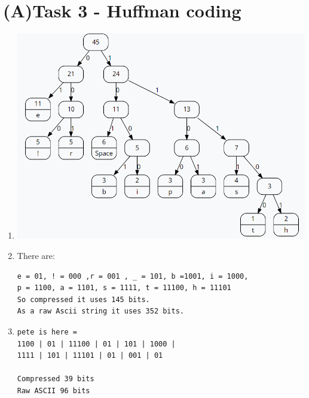 \documentclass[a4paper,12pt]{article}
\begin{document}
\section{(A)Task 3 - Huffman coding}

\begin{enumerate}
\item 
\includegraphics[scale=0.6]{hufftree}
\item There are:
\begin{lstlisting}
e = 01, ! = 000 ,r = 001 , _ = 101, b =1001, i = 1000, 
p = 1100, a = 1101, s = 1111, t = 11100, h = 11101
So compressed it uses 145 bits.
As a raw Ascii string it uses 352 bits.
\end{lstlisting}

\item 
\begin{lstlisting}
pete is here = 
1100 | 01 | 11100 | 01 | 101 | 1000 |
1111 | 101 | 11101 | 01 | 001 | 01

Compressed 39 bits
Raw ASCII 96 bits
\end{lstlisting}


\end{enumerate}

\clearpage
\end{document}
